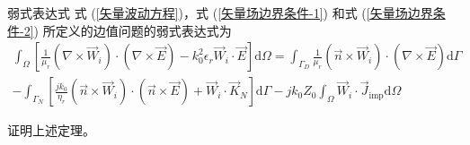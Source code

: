 \begin{theorem}{弱式表达式}
    式 (\ref{矢量波动方程})，式 (\ref{矢量场边界条件-1}) 和式
    (\ref{矢量场边界条件-2}) 所定义的边值问题的弱式表达式为
    \begin{equation}
        \begin{gathered}
            \int_{\Omega}\left[
            \frac{1}{\mu_r}
            (\nabla\times\vec{W}_i)\cdot(\nabla\times\vec{E})
            -k_0^2\epsilon_r\vec{W}_i\cdot\vec{E}
        \right]\text{d}\Omega
        =\int_{\Gamma_D}\frac{1}{\mu_r}
        (\vec{n}\times\vec{W}_i)\cdot(\nabla\times\vec{E})\text{d}\Gamma\\
        -\int_{\Gamma_N}\left[
            \frac{jk_0}{\eta_r}
            (\vec{n}\times\vec{W}_i)
            \cdot(\vec{n}\times\vec{E})
            +\vec{W}_i\cdot\vec{K}_N
        \right]\text{d}\Gamma
        -jk_0Z_0\int_{\Omega}\vec{W}_i\cdot\vec{J}_{\text{imp}}\text{d}\Omega
        \end{gathered}
    \end{equation}
\end{theorem}

\begin{exercise}
    证明上述定理。
\end{exercise}

